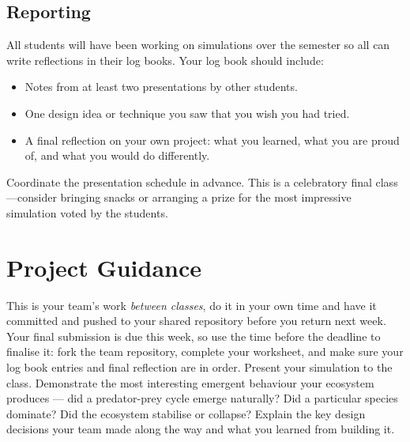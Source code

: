 \documentclass[twoside=false,DIV=14]{scrartcl}
\begin{document}
\subsection*{Reporting}

All students will have been working on simulations over the semester so all can write reflections in their log books.  Your log book should include:
\begin{itemize}
\itemsep0em
\item Notes from at least two presentations by other students.
\item One design idea or technique you saw that you wish you had tried.
\item A final reflection on your own project: what you learned, what you are proud of, and what you would do differently.
\end{itemize}

\begin{teacher}
Coordinate the presentation schedule in advance.  This is a celebratory final class---consider bringing snacks or arranging a prize for the most impressive simulation voted by the students.
\end{teacher}

\section*{Project Guidance}

This is your team's work \emph{between classes}, do it in your own time and have it committed and pushed to your shared repository before you return next week.  Your final submission is due this week, so use the time before the deadline to finalise it: fork the team repository, complete your worksheet, and make sure your log book entries and final reflection are in order.  Present your simulation to the class.  Demonstrate the most interesting emergent behaviour your ecosystem produces --- did a predator-prey cycle emerge naturally?  Did a particular species dominate?  Did the ecosystem stabilise or collapse?  Explain the key design decisions your team made along the way and what you learned from building it.
\end{document}
